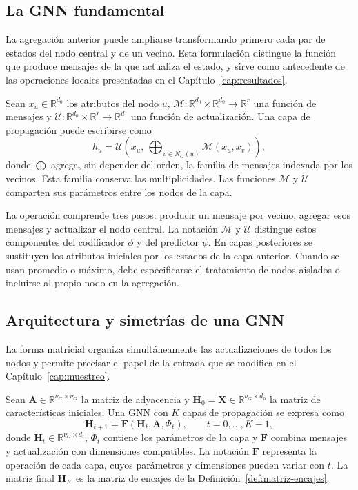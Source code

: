 \subsection{La GNN fundamental}

La agregación anterior puede ampliarse transformando primero cada par de estados del nodo central y de un vecino. Esta formulación distingue la función que produce mensajes de la que actualiza el estado, y sirve como antecedente de las operaciones locales presentadas en el Capítulo~\ref{cap:resultados}.

\begin{definition}
\label{def:gnn-fundamental}
Sean $x_u\in\mathbb R^{d_0}$ los atributos del nodo $u$, $\mathscr M:\mathbb R^{d_0}\times\mathbb R^{d_0}\to\mathbb R^r$ una función de mensajes y $\mathscr U:\mathbb R^{d_0}\times\mathbb R^r\to\mathbb R^{d_1}$ una función de actualización. Una capa de propagación puede escribirse como
\[
h_u=\mathscr U\!\left(x_u,\,\bigoplus_{v\in N_G(u)}\mathscr M(x_u,x_v)\right),
\]
donde $\bigoplus$ agrega, sin depender del orden, la familia de mensajes indexada por los vecinos. Esta familia conserva las multiplicidades. Las funciones $\mathscr M$ y $\mathscr U$ comparten sus parámetros entre los nodos de la capa.
\end{definition}

La operación comprende tres pasos: producir un mensaje por vecino, agregar esos mensajes y actualizar el nodo central. La notación $\mathscr M$ y $\mathscr U$ distingue estos componentes del codificador $\phi$ y del predictor $\psi$. En capas posteriores se sustituyen los atributos iniciales por los estados de la capa anterior. Cuando se usan promedio o máximo, debe especificarse el tratamiento de nodos aislados o incluirse al propio nodo en la agregación.

\subsection{Arquitectura y simetrías de una GNN}

La forma matricial organiza simultáneamente las actualizaciones de todos los nodos y permite precisar el papel de la entrada que se modifica en el Capítulo~\ref{cap:muestreo}.

\begin{definition}
\label{def:arquitectura-gnn}
Sean $\mathbf A\in\mathbb R^{\nu_G\times\nu_G}$ la matriz de adyacencia y $\mathbf H_0=\mathbf X\in\mathbb R^{\nu_G\times d_0}$ la matriz de características iniciales. Una GNN con $K$ capas de propagación se expresa como
\[
\mathbf H_{t+1}=\mathbf F(\mathbf H_t,\mathbf A,\Phi_t),
\qquad t=0,\ldots,K-1,
\]
donde $\mathbf H_t\in\mathbb R^{\nu_G\times d_t}$, $\Phi_t$ contiene los parámetros de la capa y $\mathbf F$ combina mensajes y actualización con dimensiones compatibles. La notación $\mathbf F$ representa la operación de cada capa, cuyos parámetros y dimensiones pueden variar con $t$. La matriz final $\mathbf H_K$ es la matriz de encajes de la Definición~\ref{def:matriz-encajes}.
\end{definition}

